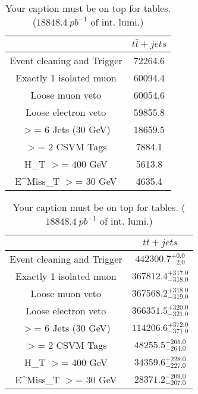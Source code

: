 \documentclass{article}
\begin{document}
\begin{table}
\caption{Your caption must be on top for tables. ($18848.4~pb^{-1}$ of int. lumi.)}
\label{tab:}
\centering
\begin{tabular}{|c|c|}
\toprule
&$t\bar{t}+jets$	\\

\midrule
Event cleaning and Trigger&	72264.6	\\

Exactly 1 isolated muon&	60094.4	\\

Loose muon veto&	60054.6	\\

Loose electron veto&	59855.8	\\

$>$= 6 Jets (30 GeV)&	18659.5	\\

$>$= 2 CSVM Tags&	7884.1	\\

H_{T} $>$=  400 GeV&	5613.8	\\

E^{Miss}_{T} $>$=  30 GeV&	4635.4	\\

\bottomrule
\end{tabular}
\end{table}
\begin{table}
\caption{Your caption must be on top for tables. ($18848.4~pb^{-1}$ of int. lumi.)}
\label{tab:}
\centering
\begin{tabular}{|c|c|}
\toprule
&$t\bar{t}+jets$	\\

\midrule
Event cleaning and Trigger&	$442300.7^{+0.0}_{-2.0}$	\\

Exactly 1 isolated muon&	$367812.4^{+317.0}_{-318.0}$	\\

Loose muon veto&	$367568.2^{+318.0}_{-319.0}$	\\

Loose electron veto&	$366351.5^{+320.0}_{-321.0}$	\\

$>$= 6 Jets (30 GeV)&	$114206.6^{+372.0}_{-371.0}$	\\

$>$= 2 CSVM Tags&	$48255.5^{+265.0}_{-264.0}$	\\

H_{T} $>$=  400 GeV&	$34359.6^{+228.0}_{-227.0}$	\\

E^{Miss}_{T} $>$=  30 GeV&	$28371.2^{+209.0}_{-207.0}$	\\

\bottomrule
\end{tabular}
\end{table}
\end{document}
